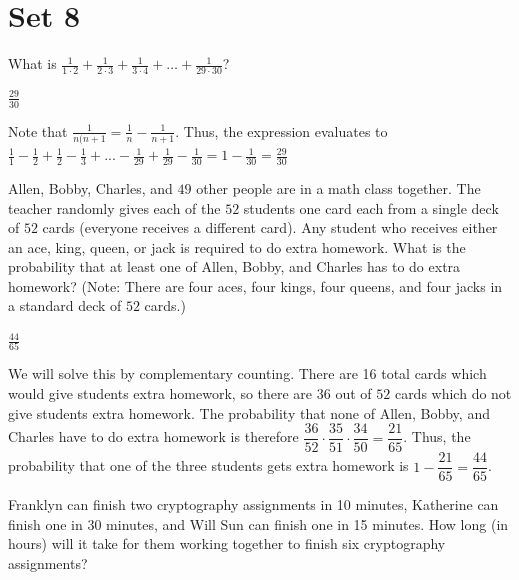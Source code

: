 \documentclass[11pt]{article}
\begin{document}
\newpage
\section*{Set 8}
\begin{problem}
What is $\frac{1}{1\cdot2}+\frac{1}{2\cdot3} + \frac{1}{3\cdot4} + \dots + \frac{1}{29\cdot30}$?
\end{problem}

\begin{answer}
$\frac{29}{30}$
\end{answer}

\begin{solution}
Note that $\frac{1}{n(n+1} = \frac{1}{n} - \frac{1}{n+1}$. Thus, the expression evaluates to $\frac{1}{1} - \frac{1}{2} + \frac{1}{2} - \frac{1}{3} + ... - \frac{1}{29} + \frac{1}{29} - \frac{1}{30} = 1-\frac{1}{30} = \boxed{\frac{29}{30}}$
\end{solution}


\begin{problem}
Allen, Bobby, Charles, and $49$ other people are in a math class together. The teacher randomly gives each of the $52$ students one card each from a single deck of $52$ cards (everyone receives a different card). Any student who receives either an ace, king, queen, or jack is required to do extra homework. What is the probability that at least one of Allen, Bobby, and Charles has to do extra homework? (Note: There are four aces, four kings, four queens, and four jacks in a standard deck of $52$ cards.) 
\end{problem}

\begin{answer}
$\frac{44}{65}$
\end{answer}

\begin{solution}
We will solve this by complementary counting. There are 16 total cards which would give students extra homework, so there are $36$ out of $52$ cards which do not give students extra homework. The probability that none of Allen, Bobby, and Charles have to do extra homework is therefore $\dfrac{36}{52}\cdot \dfrac{35}{51} \cdot \dfrac{34}{50} = \dfrac{21}{65}$. Thus, the probability that one of the three students gets extra homework is $1-\dfrac{21}{65} = \boxed{\dfrac{44}{65}}$.
\end{solution}


\begin{problem}
Franklyn can finish two cryptography assignments in 10 minutes, Katherine can finish one in 30 minutes, and Will Sun can finish one in 15 minutes. How long (in hours) will it take for them working together to finish six cryptography assignments?
\end{problem}
\end{document}
